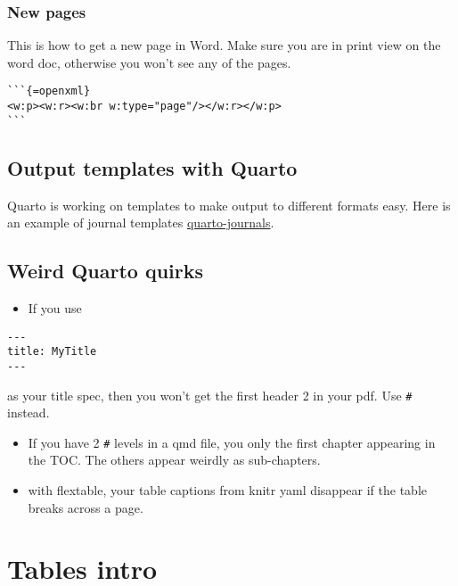 \documentclass[
  letterpaper,
  oneside]{scrbook}
\providecommand{\tightlist}{%
  \setlength{\itemsep}{0pt}\setlength{\parskip}{0pt}}\usepackage{longtable,booktabs,array}
\begin{document}
\hypertarget{new-pages}{%
\subsection{New pages}\label{new-pages}}

This is how to get a new page in Word. Make sure you are in print view
on the word doc, otherwise you won't see any of the pages.

\begin{verbatim}
```{=openxml}
<w:p><w:r><w:br w:type="page"/></w:r></w:p>
```
\end{verbatim}

\hypertarget{output-templates-with-quarto}{%
\section{Output templates with
Quarto}\label{output-templates-with-quarto}}

Quarto is working on templates to make output to different formats easy.
Here is an example of journal templates
\href{https://github.com/quarto-journals/}{quarto-journals}.

\hypertarget{weird-quarto-quirks}{%
\section{Weird Quarto quirks}\label{weird-quarto-quirks}}

\begin{itemize}
\tightlist
\item
  If you use
\end{itemize}

\begin{verbatim}
---
title: MyTitle
---
\end{verbatim}

as your title spec, then you won't get the first header 2 in your pdf.
Use \texttt{\#} instead.

\begin{itemize}
\item
  If you have 2 \texttt{\#} levels in a qmd file, you only the first
  chapter appearing in the TOC. The others appear weirdly as
  sub-chapters.
\item
  with flextable, your table captions from knitr yaml disappear if the
  table breaks across a page.
\end{itemize}


\hypertarget{tables-intro}{%
\chapter{Tables intro}\label{tables-intro}}
\end{document}
